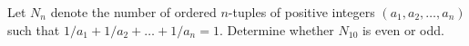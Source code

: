 Let $N_n$ denote the number of ordered $n$-tuples of positive
integers $(a_1,a_2,\ldots,a_n)$ such that $1/a_1 + 1/a_2 +\ldots +
1/a_n=1$.  Determine whether $N_{10}$ is even or odd.
